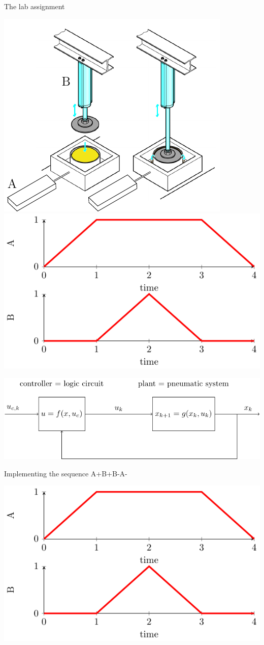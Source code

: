 \documentclass[presentation,aspectratio=1610]{beamer}
\begin{document}
\begin{frame}[label={sec:orgb52ad6b}]{The lab assignment}
\begin{center}
\includegraphics[width=0.4\linewidth]{../../figures/cheese-pressing-two-cylinders}
 \includegraphics[width=0.58\linewidth]{../../figures/AplusBplusBminAmin}
\end{center}

\begin{center}
\includegraphics[width=0.8\linewidth]{../../figures/logic-control-loop}
\end{center}
\end{frame}

\begin{frame}[label={sec:orgc4fa9cd}]{Implementing the sequence A+B+B-A-}
\begin{center}
\includegraphics[width=0.8\linewidth]{../../figures/AplusBplusBminAmin}
\end{center}
\end{frame}
\end{document}
